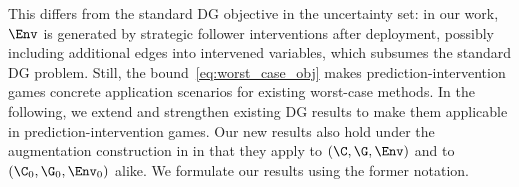 This differs from the standard DG objective \citep{rojas-carullaInvariantModelsCausal2018, arjovskyInvariantRiskMinimization2020, christiansenCausalFrameworkDistribution2021} in the uncertainty set: 
in our work,
$\Env$ is generated by strategic follower interventions after deployment, possibly including additional edges into intervened variables, which subsumes the standard DG problem.
Still, the bound~\eqref{eq:worst_case_obj} makes
prediction-intervention games concrete application scenarios for existing worst-case methods. In the following, we extend and strengthen existing DG results to make them applicable in prediction-intervention games.
Our new results also hold under the augmentation construction in  in that they apply to $(\C, \G, \Env)$ and to $(\C_0, \G_0, \Env_0)$ alike.
We formulate our results using the former notation.



